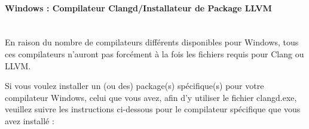 \paragraph*{Windows : Compilateur Clangd/Installateur de Package LLVM}\label{sec:win_packages} \hspace{0pt} \\
   En raison du nombre de compilateurs différents disponibles pour Windows, tous ces compilateurs n'auront pas forcément à la fois 
   les fichiers requis pour Clang ou LLVM.

   Si vous voulez installer un (ou des) package(s) spécifique(s) pour votre compilateur Windows, celui que vous avez, afin d'y utiliser le fichier clangd.exe, veuillez suivre les instructions ci-dessous pour le compilateur spécifique que vous avez installé :

